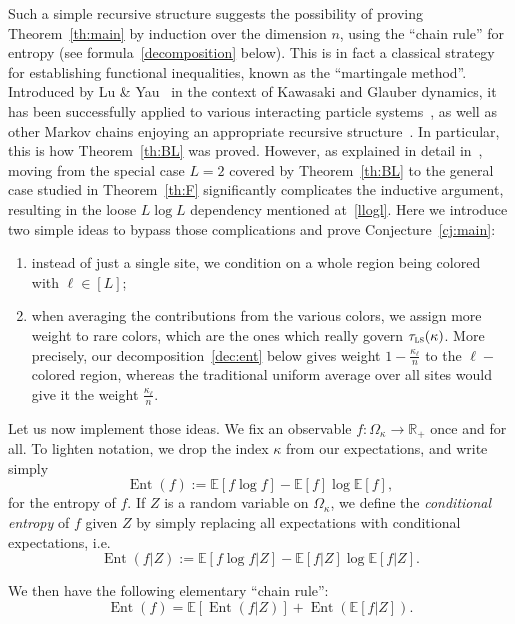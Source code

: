 \documentclass[10pt]{amsart}
\theoremstyle{definition}\newtheorem{defi}[theo]{Definition}\newtheorem{rema}[theo]{Remark}\newtheorem{exam}[theo]{Example}\newtheorem{exem}[theo]{Example}\newtheorem{nota}[theo]{Notation}
\newcommand{\R}{\mathbb{R}}
\newcommand{\EE}{\mathbb{E}}
\newcommand{\tls}{\tau_{\textsc{ls}}}
\DeclareMathOperator{\ent}{Ent}
\newcommand*{\romanenumi}{\renewcommand*{\theenumi}{\roman{enumi}}}
\begin{document}
Such a simple recursive structure suggests the possibility of proving Theorem~\ref{th:main} by induction over the dimension $n$, using the ``chain rule'' for entropy (see formula~\eqref{decomposition} below). This is in fact a classical strategy for establishing functional inequalities, known as the ``martingale method''. Introduced by Lu \& Yau~\cite{MR1233852} in the context of Kawasaki and Glauber dynamics, it has been successfully applied to various interacting particle systems~\cite{Cap,MR2094147,MR2023890,hermon2019entropy,MR1675008,MR1483598}, as well as other Markov chains enjoying an appropriate recursive structure~\cite{MR1944012,2018arXiv180903546F,2019arXiv190202775H,1181997,MR2099650}. In particular, this is how Theorem~\ref{th:BL} was proved. However, as explained in detail in~\cite{2018arXiv180903546F}, moving from the special case $L=2$ covered by Theorem~\ref{th:BL} to the general case studied in Theorem~\ref{th:F} significantly complicates the inductive argument, resulting in the loose $L\log L$ dependency mentioned at~\eqref{llogl}. Here we introduce two simple ideas to bypass those complications and prove Conjecture~\ref{cj:main}:
\begin{enumerate}\romanenumi
\item \label{3.1.i} instead of just a single site, we condition on a whole region being colored with $\ell\in[L]$;
\item \label{3.1.ii}when averaging the contributions from the various colors, we assign more weight to rare colors, which are the ones which really govern $\tls(\kappa)$. More precisely, our decomposition~\eqref{dec:ent} below gives weight $1-\frac{\kappa_\ell} n$ to the $\ell-$colored region, whereas the traditional uniform average over all sites would give it the weight $\frac{\kappa_\ell}{n}$.
\end{enumerate}
Let us now implement those ideas. We fix an observable $f\colon\Omega_\kappa\to\R_+$ once and for all. To lighten notation, we drop the index $\kappa$ from our expectations, and write simply
\[
\ent(f) := \EE\left[f\log f\right] -\EE[f]\log\EE[f],
\]
for the entropy of $f$. If $Z$ is a random variable on $\Omega_\kappa$, we define the \emph{conditional entropy} of $f$ given $Z$ by simply replacing all expectations with conditional expectations, i.e.
\[
\ent(f|Z) := \EE[f\log f|Z] -\EE[f|Z]\log\EE[f|Z].
\]

We then have the following elementary ``chain rule'':
\begin{equation}\label{decomposition}
\ent(f) = \EE\left[\ent(f|Z)\right]+\ent\left(\EE[f|Z]\right).
\end{equation}
\end{document}
